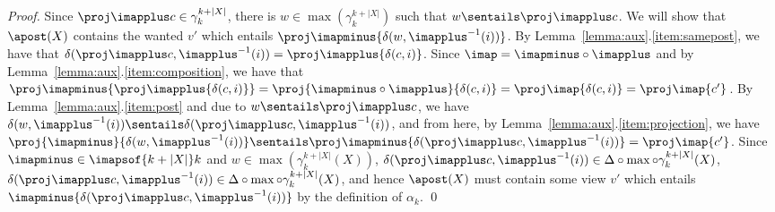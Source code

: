 \begin{proof}
Since $\proj \imapplus c \in \gamma_{k}^{k+|X|}$, there is $w\in\max(\gamma_{k}^{k+|X|})$ such that $w\sentails\proj \imapplus c$.
We will show that $\apost(X)$ contains the wanted $v'$ which entails $\proj \imapminus {\delta(w,\imapplus^{-1}(i))}$. %
By Lemma~\ref{lemma:aux}.\ref{item:samepost}, we have that $\delta(\proj \imapplus c,\imapplus^{-1}(i)) = \proj \imapplus {\delta(c,i)}$. 
Since $\imap= \imapminus\circ\imapplus$ and by Lemma~\ref{lemma:aux}.\ref{item:composition}, 
we have that $\proj \imapminus {\proj \imapplus {\delta(c,i)}} = \proj {\imapminus\circ\imapplus} {\delta(c,i)} = \proj \imap {\delta(c,i)} =  \proj \imap {c'}$. 
By Lemma~\ref{lemma:aux}.\ref{item:post} and due to $w\sentails \proj \imapplus c$, we have $\delta(w,\imapplus^{-1}(i))\sentails\delta(\proj \imapplus c,\imapplus^{-1}(i))$, and from here, by Lemma~\ref{lemma:aux}.\ref{item:projection},  
we have
$\proj {\imapminus} {\delta(w,\imapplus^{-1}(i))}\sentails\proj \imapminus {\delta(\proj \imapplus c,\imapplus^{-1}(i))} = \proj \imap {c'}$.
Since $\imapminus\in\imapsof {k+|X|} k$ and $w\in \max(\gamma_k^{k+|X|}(X))$,
$\delta(\proj \imapplus c,\imapplus^{-1}(i))\in\Delta\circ\max\circ\gamma_k^{k+|X|}(X)$,$\delta(\proj \imapplus c,\imapplus^{-1}(i))\in\Delta\circ\max\circ\gamma_k^{k+|X|}(X)$,  and hence $\apost(X)$ must contain some view $v'$ which entails $\imapminus {\delta(\proj \imapplus c,\imapplus^{-1}(i))}$ by the definition of $\alpha_k$.
\qed
\end{proof}





